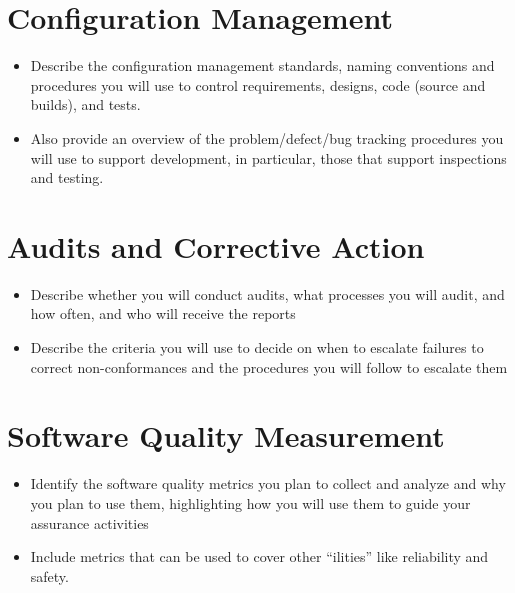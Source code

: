 \documentclass[11pt]{wacomepd} \usepackage{amssymb} \usepackage{enumerate}
\begin{document}
\chapter{Configuration Management}
\begin{itemize}
\item Describe the configuration management standards, naming conventions and procedures you will
  use to control requirements, designs, code (source and builds), and tests.
\item Also provide an overview of the problem/defect/bug tracking procedures you will use to support
  development, in particular, those that support inspections and testing.
\end{itemize}


\chapter{Audits and Corrective Action}
\begin{itemize}
\item Describe whether you will conduct audits, what processes you will audit, and how often, and
  who will receive the reports
\item Describe the criteria you will use to decide on when to escalate failures to correct
  non-conformances and the procedures you will follow to escalate them
\end{itemize}




\chapter{Software Quality Measurement}
\begin{itemize}
\item Identify the software quality metrics you plan to collect and analyze and why you plan to use
  them, highlighting how you will use them to guide your assurance activities
\item Include metrics that can be used to cover other “ilities” like reliability and safety.
\end{itemize}



\end{document}
